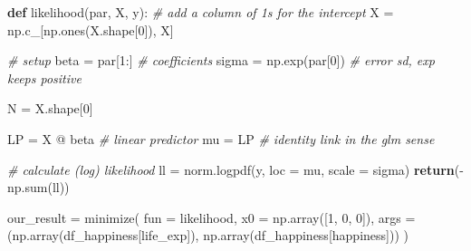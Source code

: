 \documentclass[
  letterpaper,
]{krantz}
\newenvironment{Shaded}{}{}
\newcommand{\BuiltInTok}[1]{\textcolor[rgb]{0.00,0.50,0.00}{#1}}
\newcommand{\CommentTok}[1]{\textcolor[rgb]{0.38,0.63,0.69}{\textit{#1}}}
\newcommand{\ControlFlowTok}[1]{\textcolor[rgb]{0.00,0.44,0.13}{\textbf{#1}}}
\newcommand{\DecValTok}[1]{\textcolor[rgb]{0.25,0.63,0.44}{#1}}
\newcommand{\KeywordTok}[1]{\textcolor[rgb]{0.00,0.44,0.13}{\textbf{#1}}}
\newcommand{\NormalTok}[1]{#1}
\newcommand{\OperatorTok}[1]{\textcolor[rgb]{0.40,0.40,0.40}{#1}}
\newcommand{\StringTok}[1]{\textcolor[rgb]{0.25,0.44,0.63}{#1}}
\begin{document}
\begin{Shaded}
\begin{Highlighting}[]
\KeywordTok{def}\NormalTok{ likelihood(par, X, y):}
    \CommentTok{\# add a column of 1s for the intercept}
\NormalTok{    X }\OperatorTok{=}\NormalTok{ np.c\_[np.ones(X.shape[}\DecValTok{0}\NormalTok{]), X]}

    \CommentTok{\# setup}
\NormalTok{    beta   }\OperatorTok{=}\NormalTok{ par[}\DecValTok{1}\NormalTok{:]         }\CommentTok{\# coefficients}
\NormalTok{    sigma  }\OperatorTok{=}\NormalTok{ np.exp(par[}\DecValTok{0}\NormalTok{])  }\CommentTok{\# error sd, exp keeps positive}

\NormalTok{    N }\OperatorTok{=}\NormalTok{ X.shape[}\DecValTok{0}\NormalTok{]}

\NormalTok{    LP }\OperatorTok{=}\NormalTok{ X }\OperatorTok{@}\NormalTok{ beta          }\CommentTok{\# linear predictor}
\NormalTok{    mu }\OperatorTok{=}\NormalTok{ LP                }\CommentTok{\# identity link in the glm sense}

    \CommentTok{\# calculate (log) likelihood}
\NormalTok{    ll }\OperatorTok{=}\NormalTok{ norm.logpdf(y, loc }\OperatorTok{=}\NormalTok{ mu, scale }\OperatorTok{=}\NormalTok{ sigma) }
    \ControlFlowTok{return}\NormalTok{(}\OperatorTok{{-}}\NormalTok{np.}\BuiltInTok{sum}\NormalTok{(ll))}

\NormalTok{our\_result }\OperatorTok{=}\NormalTok{ minimize(}
\NormalTok{    fun  }\OperatorTok{=}\NormalTok{ likelihood,}
\NormalTok{    x0   }\OperatorTok{=}\NormalTok{ np.array([}\DecValTok{1}\NormalTok{, }\DecValTok{0}\NormalTok{, }\DecValTok{0}\NormalTok{]),}
\NormalTok{    args }\OperatorTok{=}\NormalTok{ (np.array(df\_happiness[}\StringTok{\textquotesingle{}life\_exp\textquotesingle{}}\NormalTok{]), np.array(df\_happiness[}\StringTok{\textquotesingle{}happiness\textquotesingle{}}\NormalTok{]))}
\NormalTok{)}
\end{Highlighting}
\end{Shaded}
\end{document}
